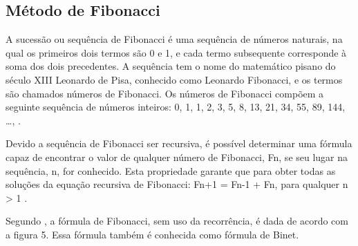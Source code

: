 \subsection{Método de Fibonacci}

A sucessão ou sequência de Fibonacci é uma sequência de números naturais, na qual os primeiros dois termos são 0 e 1, e cada termo subsequente corresponde à soma dos dois precedentes. A sequência tem o nome do matemático pisano do século XIII Leonardo de Pisa,  conhecido como Leonardo Fibonacci, e os termos são chamados números de Fibonacci. Os números de Fibonacci compõem a seguinte sequência de números inteiros: 0, 1, 1, 2, 3, 5, 8, 13, 21, 34, 55, 89, 144, …, \cite[p.~6]{gagliardi2013}.

Devido a sequência de Fibonacci ser recursiva, é possível determinar uma fórmula capaz de encontrar o valor de qualquer número de Fibonacci, Fn, se seu lugar na sequência, n, for conhecido. Esta propriedade garante que para obter todas as soluções da equação recursiva de Fibonacci: Fn+1 = Fn-1 + Fn, para qualquer n > 1 \cite[p.~12]{sousa2012}.

Segundo , a fórmula de Fibonacci, sem uso da recorrência, é dada de acordo com a figura 5. Essa fórmula também é conhecida como fórmula de Binet.

